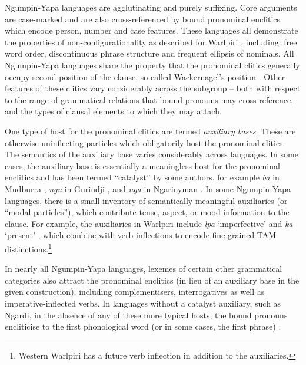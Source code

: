 \documentclass[output=paper,colorlinks,citecolor=brown]{langscibook}
\begin{document}
Ngumpin-Yapa languages are agglutinating and purely suffixing. Core arguments are case-marked and are also cross-referenced by bound pronominal enclitics which encode person, number and case features. These languages all demonstrate the properties of non-configurationality as described for Warlpiri \citep{hale_warlpiri_1983}, including: free word order, discontinuous phrase structure and frequent ellipsis of nominals. All Ngumpin-Yapa languages share the property that the pronominal clitics generally occupy second position of the clause, so-called Wackernagel's position \citep{wackernagel_uber_1892}. Other features of these clitics vary considerably across the subgroup -- both with respect to the range of grammatical relations that bound pronouns may cross-reference, and the types of clausal elements to which they may attach.

One type of host for the pronominal clitics are termed \textit{auxiliary bases}. These are otherwise uninflecting particles which obligatorily host the pronominal clitics. The semantics of the auxiliary base varies considerably across languages. In some cases, the auxiliary base is essentially a meaningless host for the pronominal enclitics and has been termed ``catalyst'' by some authors, for example \textit{ba} in Mudburra \citep[68--69]{capell_new_1956}, \textit{ngu} in Gurindji \citep{mcconvell_functions_1996}, and \textit{nga} in Ngarinyman \citep[30]{jones_ngarinyman_2019}. In some Ngumpin-Yapa languages, there is a small inventory of semantically meaningful auxiliaries (or ``modal particles''), which contribute tense, aspect, or mood information to the clause. For example, the auxiliaries in Warlpiri include \textit{lpa} `imperfective' and \textit{ka} `present' \citep{laughren_revised_2013}, which combine with verb inflections to encode fine-grained TAM distinctions.\footnote{Western Warlpiri has a future verb inflection in addition to the auxiliaries.} 

In nearly all Ngumpin-Yapa languages, lexemes of certain other grammatical categories also attract the pronominal enclitics (in lieu of an auxiliary base in the given construction), including complementisers, interrogatives as well as imperative-inflected verbs. In languages without a catalyst auxiliary, such as Ngardi, in the absence of any of these more typical hosts, the bound pronouns encliticise to the first phonological word (or in some cases, the first phrase) \citep[310--313]{ennever_grammar_2021}.
\end{document}
